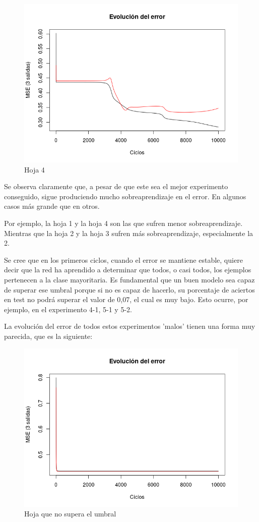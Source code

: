 \documentclass{uc3mpracticas}
\begin{document}
\begin{figure}[!h]
\begin{minipage}{.52\textwidth}
  \includegraphics[width=.8\linewidth]{Images/best_fold4.png}
  \caption*{Hoja 4}
\end{minipage}
\end{figure}

\newpage

Se observa claramente que, a pesar de que este sea el mejor experimento conseguido, sigue produciendo mucho sobreaprendizaje en el error. En algunos casos más grande que en otros.

\vspace{2mm}

Por ejemplo, la hoja 1 y la hoja 4 son las que sufren menor sobreaprendizaje. Mientras que la hoja 2 y la hoja 3 sufren más sobreaprendizaje, especialmente la 2.

\vspace{2mm}

Se cree que en los primeros ciclos, cuando el error se mantiene estable, quiere decir que la red ha aprendido a determinar que todos, o casi todos, los ejemplos pertenecen a la clase mayoritaria. Es fundamental que un buen modelo sea capaz de superar ese umbral porque si no es capaz de hacerlo, su porcentaje de aciertos en test no podrá superar el valor de 0,07, el cual es muy bajo. Esto ocurre, por ejemplo, en el experimento 4-1, 5-1 y 5-2.

\vspace{1mm}

La evolución del error de todos estos experimentos 'malos' tienen una forma muy parecida, que es la siguiente:

\begin{figure}[!h]
\centering
  \includegraphics[width=.4\linewidth]{Images/fail.png}
  \caption*{Hoja que no supera el umbral}
\end{figure}
\end{document}
